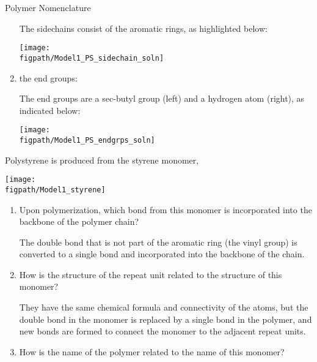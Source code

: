 \begin{activity}{Polymer Nomenclature}
\begin{ctqs}
\begin{enumerate}
				\begin{solution}[0.5in]{}
					The sidechains consist of the aromatic rings, as highlighted below:
					
					\centerline{\texttt{[image: \\figpath/Model1\_PS\_sidechain\_soln]}}
				\end{solution}
			
			\item the end groups:
			
				\begin{solution}[0.5in]{}
					The end groups are a sec-butyl group (left) and a hydrogen atom (right), as indicated below:
					
					\centerline{\texttt{[image: \\figpath/Model1\_PS\_endgrps\_soln]}}
				\end{solution}
			
			
		\end{enumerate}
		
	\question Polystyrene is produced from the styrene monomer,
	
		\centerline{\texttt{[image: \\figpath/Model1\_styrene]}}
	
		\begin{enumerate}
			\item Upon polymerization, which bond from this monomer is incorporated into the backbone of the polymer chain?
			
				\begin{solution}[0.5in]{}
				
					The double bond that is not part of the aromatic ring (the vinyl group) is converted to a single bond and incorporated into the backbone of the chain.
					
				\end{solution}
				
			\item How is the structure of the repeat unit related to the structure of this monomer?
			
				\begin{solution}[0.5in]{}
				
					They have the same chemical formula and connectivity of the atoms, but the double bond in the monomer is replaced by a single bond in the polymer, and new bonds are formed to connect the monomer to the adjacent repeat units.
					
				\end{solution}
				
			\item How is the name of the polymer related to the name of this monomer?
			

\end{enumerate}
\end{ctqs}
\end{activity}
